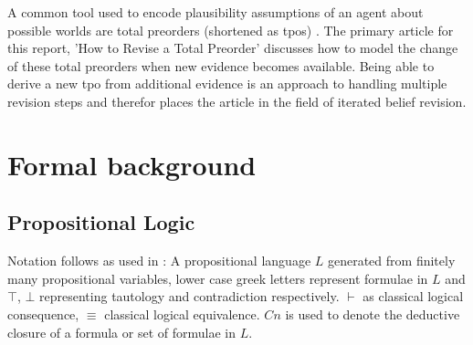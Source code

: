 \documentclass[11pt]{scrartcl}
\theoremstyle{definition}
\begin{document}

A common tool used to encode plausibility assumptions of an agent about possible worlds are total preorders (shortened as tpos) \cite{Booth2011}. The primary article for this report, 'How to Revise a Total Preorder' discusses how to model the change of these total preorders when new evidence becomes available. Being able to derive a new tpo from additional evidence is an approach to handling multiple revision steps and therefor places the article in the field of iterated belief revision.

\section{Formal background}

\subsection{Propositional Logic} %
Notation follows as used in \cite{Booth2011}: A propositional language $L$ generated from finitely many propositional variables, lower case greek letters represent formulae in $L$ and $\top$, $\bot$ representing tautology and contradiction respectively. $\vdash$ as classical logical consequence, $\equiv$ classical logical equivalence. $Cn$ is used to denote the deductive closure of a formula or set of formulae in $L$.
\end{document}
